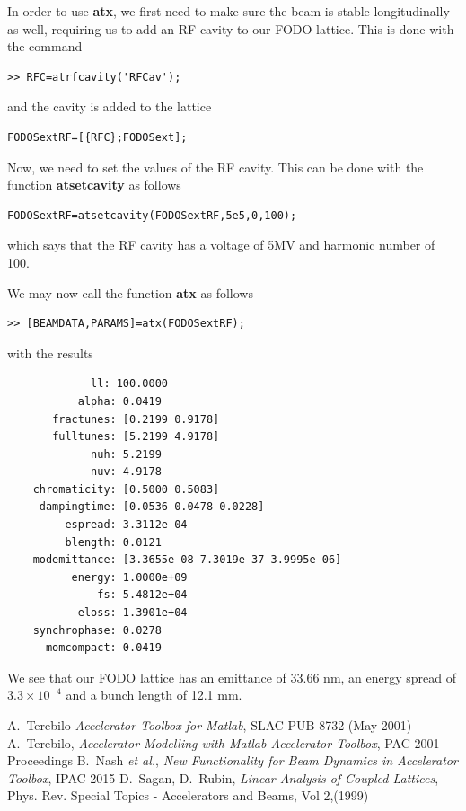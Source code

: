 \documentclass[acus]{article}
\newcommand{\mfun}[1]{{\bf{#1}}}
\begin{document}
In order to use \mfun{atx}, we first need to make sure the beam is stable longitudinally as 
well, requiring us to add an RF cavity to our FODO lattice.  This is done with the command
\begin{verbatim}
>> RFC=atrfcavity('RFCav');
\end{verbatim}
and the cavity is added to the lattice
\begin{verbatim}
FODOSextRF=[{RFC};FODOSext];
\end{verbatim}
Now, we need to set the values of the RF cavity.  This can be done with the 
function \mfun{atsetcavity} as follows
\begin{verbatim}
FODOSextRF=atsetcavity(FODOSextRF,5e5,0,100);
\end{verbatim}
which says that the RF cavity has a voltage of 5MV and harmonic number of 100.

We may now call the function \mfun{atx} as follows
\begin{verbatim}
>> [BEAMDATA,PARAMS]=atx(FODOSextRF);
\end{verbatim}
with the results
\begin{verbatim}
             ll: 100.0000
           alpha: 0.0419
       fractunes: [0.2199 0.9178]
       fulltunes: [5.2199 4.9178]
             nuh: 5.2199
             nuv: 4.9178
    chromaticity: [0.5000 0.5083]
     dampingtime: [0.0536 0.0478 0.0228]
         espread: 3.3112e-04
         blength: 0.0121
    modemittance: [3.3655e-08 7.3019e-37 3.9995e-06]
          energy: 1.0000e+09
              fs: 5.4812e+04
           eloss: 1.3901e+04
    synchrophase: 0.0278
      momcompact: 0.0419
\end{verbatim}
We see that our FODO lattice has an emittance of 33.66 nm, an energy spread of $3.3\times 10^{-4}$
and a bunch length of 12.1 mm.

\begin{thebibliography}{4}

A.~Terebilo \emph{Accelerator Toolbox for Matlab}, SLAC-PUB 8732 (May 2001)
A.~Terebilo, \emph{Accelerator Modelling with Matlab Accelerator Toolbox}, PAC 2001 Proceedings
B.~Nash \textit{et al.}, \emph{New Functionality for Beam Dynamics in Accelerator Toolbox}, IPAC 2015
D.~Sagan, D.~Rubin, \emph{Linear Analysis of Coupled Lattices}, Phys. Rev. Special Topics - Accelerators and Beams, Vol 2,(1999)

\end{thebibliography}
\end{document}
